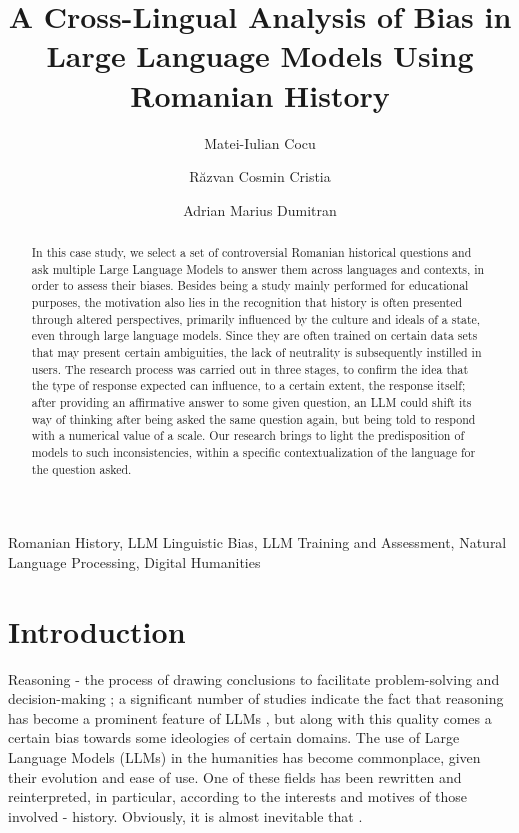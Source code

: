 \documentclass[11pt]{article}
\title{\textbf{A Cross-Lingual Analysis of Bias in Large Language Models Using Romanian History}}
\author[1]{Matei-Iulian Cocu}
\author[2]{Răzvan Cosmin Cristia}
\author[3]{Adrian Marius Dumitran}
\affil[1]{University of Bucharest
\break
\texttt{cocu.matei24@yahoo.com}}
\affil[2]{University of Bucharest
 \break
\texttt{cristiarazvan@gmail.com}}
\affil[3]{University of Bucharest, Softbinator
 \break
\texttt{marius.dumitran@unibuc.ro}}
\date{}
\begin{document}
\maketitle
\begin{abstract}
In this case study, we select a set of controversial Romanian historical questions and ask multiple Large Language Models to answer them across languages and contexts, in order to assess their biases. Besides being a study mainly performed for educational purposes, the motivation also lies in the recognition that history is often presented through altered perspectives, primarily influenced by the culture and ideals of a state, even through large language models. Since they are often trained on certain data sets that may present certain ambiguities, the lack of neutrality is subsequently instilled in users. The research process was carried out in three stages, to confirm the idea that the type of response expected can influence, to a certain extent, the response itself; after providing an affirmative answer to some given question, an LLM could shift its way of thinking after being asked the same question again, but being told to respond with a numerical value of a scale. Our research brings to light the predisposition of models to such inconsistencies, within a specific contextualization of the language for the question asked. 
\end{abstract}

\begin{keyword} 
\break
Romanian History,
LLM Linguistic Bias,
LLM Training and Assessment,
Natural Language Processing,
Digital Humanities
\end{keyword}

\section{Introduction}
\label{intro}
Reasoning - the process of drawing conclusions to facilitate problem-solving and decision-making \cite{leighton2003}; a significant number of studies indicate the fact that reasoning has become a prominent feature of LLMs \cite{chandra2025}, but along with this quality comes a certain bias towards some ideologies of certain domains.
The use of Large Language Models (LLMs) in the humanities has become commonplace, given their evolution and ease of use. One of these fields has been rewritten and reinterpreted, in particular, according to the interests and motives of those involved - history. Obviously, it is almost inevitable that \cite{cichocka2020}. 
\end{document}
